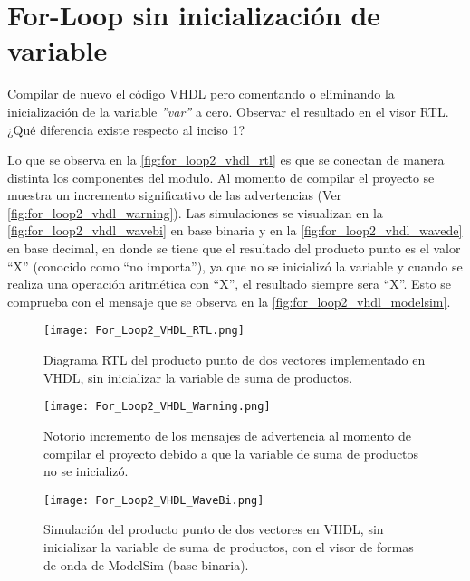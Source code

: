 \section{For-Loop sin inicialización de variable \label{sec:s2}}

\begin{center}
	\begin{minipage}{12cm}
		\begin{tcolorbox}[title=Actividad 2]
			Compilar de nuevo el código VHDL pero comentando o eliminando la inicialización de la variable \textit{''var''} a cero. Observar el resultado en el visor RTL. ¿Qué diferencia existe respecto al inciso 1?
		\end{tcolorbox}	
	\end{minipage}
\end{center}

Lo que se observa en la \autoref{fig:for_loop2_vhdl_rtl} es que se conectan de manera distinta los componentes del modulo. Al momento de compilar el proyecto se muestra un incremento significativo de las advertencias (Ver \autoref{fig:for_loop2_vhdl_warning}). Las simulaciones se visualizan en la \autoref{fig:for_loop2_vhdl_wavebi} en base binaria y en la \autoref{fig:for_loop2_vhdl_wavede} en base decimal, en donde se tiene que el resultado del producto punto es el valor ``X'' (conocido como ``no importa''), ya que no se inicializó la variable y cuando se realiza una operación aritmética con ``X'', el resultado siempre sera ``X''. Esto se comprueba con el mensaje que se observa en la \autoref{fig:for_loop2_vhdl_modelsim}.

\begin{figure}[ht]
	\centering
	\texttt{[image: For\_Loop2\_VHDL\_RTL.png]}
	\caption{Diagrama RTL del producto punto de dos vectores implementado en VHDL, sin inicializar la variable de suma de productos. \label{fig:for_loop2_vhdl_rtl}}
\end{figure}

\begin{figure}[ht]
	\centering
	\texttt{[image: For\_Loop2\_VHDL\_Warning.png]}
	\caption{Notorio incremento de los mensajes de advertencia al momento de compilar el proyecto debido a que la variable de suma de productos no se inicializó. \label{fig:for_loop2_vhdl_warning}}
\end{figure}

\begin{figure}[ht]
	\centering
	\texttt{[image: For\_Loop2\_VHDL\_WaveBi.png]}
	\caption{Simulación del producto punto de dos vectores en VHDL, sin inicializar la variable de suma de productos, con el visor de formas de onda de ModelSim (base binaria). \label{fig:for_loop2_vhdl_wavebi}}
\end{figure}

